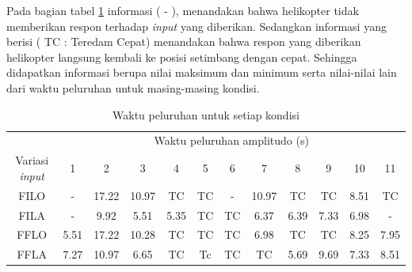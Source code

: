 Pada bagian tabel \ref{tb:waktupeluruhan} informasi ( - ), menandakan bahwa helikopter tidak memberikan respon terhadap \textit{input} yang diberikan. Sedangkan informasi yang berisi ( TC : Teredam Cepat) menandakan bahwa respon yang diberikan helikopter langsung kembali ke posisi setimbang dengan cepat. Sehingga didapatkan informasi berupa nilai maksimum dan minimum serta nilai-nilai lain dari waktu peluruhan untuk masing-masing kondisi. 

\begin{table}[]
	\caption{Waktu peluruhan untuk setiap kondisi}
	\label{tb:waktupeluruhan}
	\begin{tabular}{|c|ccccccccccc|}
		\hline
		& \multicolumn{11}{c|}{Waktu peluruhan amplitudo (s)} \\ \cline{2-12} 
		\multirow{-2}{*}{Variasi \textit{input}} & \multicolumn{1}{c|}{1} & \multicolumn{1}{c|}{2} & \multicolumn{1}{c|}{3} & \multicolumn{1}{c|}{4} & \multicolumn{1}{c|}{5} & \multicolumn{1}{c|}{6} & \multicolumn{1}{c|}{7} & \multicolumn{1}{c|}{8} & \multicolumn{1}{c|}{9} & \multicolumn{1}{c|}{10} & 11 \\ \hline
		FILO & \multicolumn{1}{c|}{\cellcolor[HTML]{FFCCC9}-} & \multicolumn{1}{c|}{17.22} & \multicolumn{1}{c|}{10.97} & \multicolumn{1}{c|}{\cellcolor[HTML]{FFFFC7}TC} & \multicolumn{1}{c|}{\cellcolor[HTML]{FFFFC7}TC} & \multicolumn{1}{c|}{\cellcolor[HTML]{FFCCC9}-} & \multicolumn{1}{c|}{10.97} & \multicolumn{1}{c|}{\cellcolor[HTML]{FFFFC7}TC} & \multicolumn{1}{c|}{\cellcolor[HTML]{FFFFC7}TC} & \multicolumn{1}{c|}{8.51} & \cellcolor[HTML]{FFFFC7}TC \\ \hline
		FILA & \multicolumn{1}{c|}{\cellcolor[HTML]{FFCCC9}-} & \multicolumn{1}{c|}{9.92} & \multicolumn{1}{c|}{5.51} & \multicolumn{1}{c|}{5.35} & \multicolumn{1}{c|}{\cellcolor[HTML]{FFFFC7}TC} & \multicolumn{1}{c|}{\cellcolor[HTML]{FFFFC7}TC} & \multicolumn{1}{c|}{6.37} & \multicolumn{1}{c|}{6.39} & \multicolumn{1}{c|}{7.33} & \multicolumn{1}{c|}{6.98} & \cellcolor[HTML]{FFCCC9}- \\ \hline
		FFLO & \multicolumn{1}{c|}{5.51} & \multicolumn{1}{c|}{17.22} & \multicolumn{1}{c|}{10.28} & \multicolumn{1}{c|}{\cellcolor[HTML]{FFFFC7}TC} & \multicolumn{1}{c|}{\cellcolor[HTML]{FFFFC7}TC} & \multicolumn{1}{c|}{\cellcolor[HTML]{FFFFC7}TC} & \multicolumn{1}{c|}{6.98} & \multicolumn{1}{c|}{\cellcolor[HTML]{FFFFC7}TC} & \multicolumn{1}{c|}{\cellcolor[HTML]{FFFFC7}TC} & \multicolumn{1}{c|}{8.25} & 7.95 \\ \hline
		FFLA & \multicolumn{1}{c|}{7.27} & \multicolumn{1}{c|}{10.97} & \multicolumn{1}{c|}{6.65} & \multicolumn{1}{c|}{\cellcolor[HTML]{FFFFC7}TC} & \multicolumn{1}{c|}{\cellcolor[HTML]{FFFFC7}Tc} & \multicolumn{1}{c|}{\cellcolor[HTML]{FFFFC7}TC} & \multicolumn{1}{c|}{\cellcolor[HTML]{FFFFC7}TC} & \multicolumn{1}{c|}{5.69} & \multicolumn{1}{c|}{9.69} & \multicolumn{1}{c|}{7.33} & 8.51 \\ \hline

\end{tabular}
\end{table}
